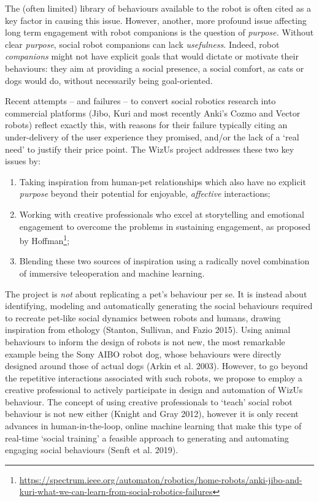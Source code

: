 \documentclass[11pt,a4paper]{report}
\newcommand{\project}{WizUs\xspace}
\begin{document}
The (often limited) library of behaviours available to the robot is
often cited as a key factor in causing this issue. However, another,
more profound issue affecting long term engagement with robot companions
is the question of \emph{purpose.} Without clear \emph{purpose}, social
robot companions can lack \emph{usefulness}. Indeed, robot
\emph{companions} might not have explicit goals that would dictate or
motivate their behaviours: they aim at providing a social presence, a
social comfort, as cats or dogs would do, without necessarily being
goal-oriented.

Recent attempts -- and failures -- to convert social robotics research
into commercial platforms (Jibo, Kuri and most recently Anki's Cozmo and
Vector robots) reflect exactly this, with reasons for their failure
typically citing an under-delivery of the user experience they promised,
and/or the lack of a `real need' to justify their price point. The
\project project addresses these two key issues by:

\begin{enumerate}
\def\labelenumi{\arabic{enumi}.}
\item
  Taking inspiration from human-pet relationships which also have no
  explicit \emph{purpose} beyond their potential for enjoyable,
  \emph{affective} interactions;
\item
  Working with creative professionals who excel at storytelling and
  emotional engagement to overcome the problems in sustaining
  engagement, as proposed by Hoffman\footnote{\url{https://spectrum.ieee.org/automaton/robotics/home-robots/anki-jibo-and-kuri-what-we-can-learn-from-social-robotics-failures}};
\item
  Blending these two sources of inspiration using a radically novel
  combination of immersive teleoperation and machine learning.
\end{enumerate}

The project is \emph{not} about replicating a pet's behaviour per se. It
is instead about identifying, modeling and automatically generating the
social behaviours required to recreate pet-like social dynamics between
robots and humans, drawing inspiration from ethology (Stanton, Sullivan,
and Fazio 2015). Using animal behaviours to inform the design of robots
is not new, the most remarkable example being the Sony AIBO robot dog,
whose behaviours were directly designed around those of actual dogs
(Arkin et al. 2003). However, to go beyond the repetitive interactions
associated with such robots, we propose to employ a creative
professional to actively participate in design and automation of \project
behaviour. The concept of using creative professionals to `teach' social
robot behaviour is not new either (Knight and Gray 2012), however it is
only recent advances in human-in-the-loop, online machine learning that
make this type of real-time `social training' a feasible approach to
generating and automating engaging social behaviours (Senft et al.
2019).
\end{document}
